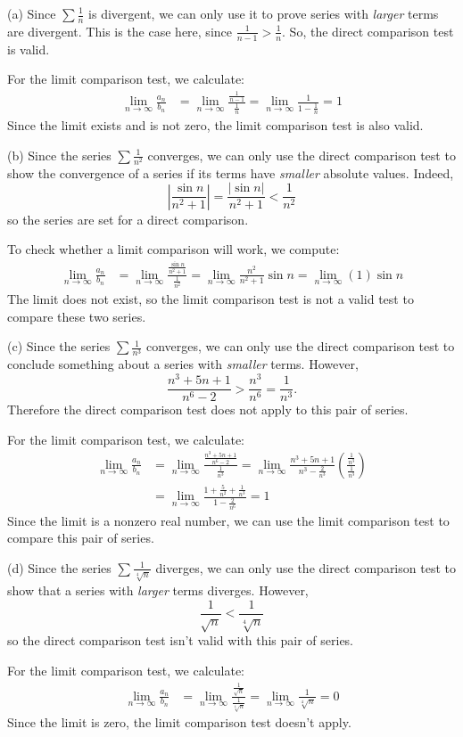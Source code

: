 \begin{solution}
(a) Since $\sum \frac{1}{n}$ is divergent, we can only use it to prove series with \emph{larger} terms are divergent. This is the case here, since $\frac{1}{n-1}>\frac{1}{n}$. So, the direct comparison test is valid.

For the limit comparison test, we calculate:
\begin{align*}
\lim_{n \to \infty}\frac{a_n}{b_n}&=\lim_{n \to \infty}\frac{\frac{1}{n-1}}{\frac{1}{n}}
=\lim_{n \to \infty}\frac{1}{1-\frac{1}{n}}
=1
\end{align*}
Since the limit exists and is not zero, the limit comparison test is also valid.

(b) Since the series $\sum \frac{1}{n^2}$ converges, we can only use the direct comparison test to show the convergence of a series if its terms have \emph{smaller} absolute values. Indeed,
\[\left| \frac{\sin n}{n^2+1}\right|=\frac{|\sin n|}{n^2+1}<\frac{1}{n^2}\]
so the series are set for a direct comparison.

To check whether a limit comparison will work, we compute:
\begin{align*}
\lim_{n \to \infty}\frac{a_n}{b_n}&=\lim_{n \to \infty} \frac{\frac{\sin n}{n^2+1}}{\frac{1}{n^2}} = \lim_{n \to \infty}\frac{n^2}{n^2+1}\sin n = \lim_{n \to \infty}(1)\sin n
\end{align*}
The limit does not exist, so the limit comparison test is not a valid test to compare these two series.

(c) Since the series $\sum \frac{1}{n^3}$ converges, we can only use the direct comparison test to conclude something about a series with \emph{smaller} terms. However, \[\frac{n^3+5n+1}{n^6-2}>\frac{n^3}{n^6}=\frac{1}{n^3}.\]
Therefore the direct comparison test does not apply to this pair of series.

For the limit comparison test, we calculate:
\begin{align*}
\lim_{n \to \infty}\frac{a_n}{b_n}&=\lim_{n \to \infty}\frac{\frac{n^3+5n+1}{n^6-2}}{  \frac{1}{n^3}} = \lim_{n \to \infty}\frac{n^3+5n+1}{n^3-\frac{2}{n^3}}\left(\frac{\frac{1}{n^3}}{\frac{1}{n^3}}\right)\\
&=\lim_{n \to \infty}\frac{1+\frac{5}{n^2}+\frac{1}{n^3}}{1-\frac{2}{n^6}}=1
\end{align*}
Since the limit is a nonzero real number, we can use the limit comparison test to compare this pair of series.

(d) Since the series $\sum \frac{1}{\sqrt[4]{n}}$ diverges, we can only use the direct comparison test to show that a series with \emph{larger} terms diverges. However,
\[\frac{1}{\sqrt{n}}<\frac{1}{\sqrt[4]{n}}\]
so the direct comparison test isn't valid with this pair of series.

For the limit comparison test, we calculate:
\begin{align*}
\lim_{n \to \infty}\frac{a_n}{b_n}&=\lim_{n \to \infty}\frac{\frac{1}{\sqrt{n}}}{\frac{1}{\sqrt[4]{n}}}=\lim_{n \to \infty}\frac{1}{\sqrt[4]{n}}=0
\end{align*}
Since the limit is zero, the limit comparison test doesn't apply.
\end{solution}
